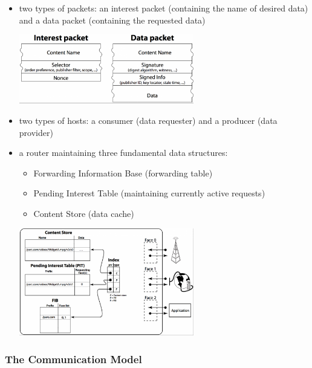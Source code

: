                     \begin{itemize}
                        \item two types of packets: an interest packet (containing the name of desired data) and a data packet (containing the requested data)
                    \begin{center}\includegraphics[width=0.6\textwidth]{media/ndn_packets1.png}\end{center}
                        \item two types of hosts: a consumer (data requester) and a producer (data provider)
                        \item a router maintaining three fundamental data structures:
                        \begin{itemize}
                            \item Forwarding Information Base (forwarding table)
                            \item Pending Interest Table (maintaining currently active requests)
                            \item Content Store (data cache)
                        \end{itemize}
                        \begin{center}\includegraphics[width=0.6\textwidth]{media/ndn_router1.png}\end{center}

                    \end{itemize}

                \subsubsection{The Communication Model}

